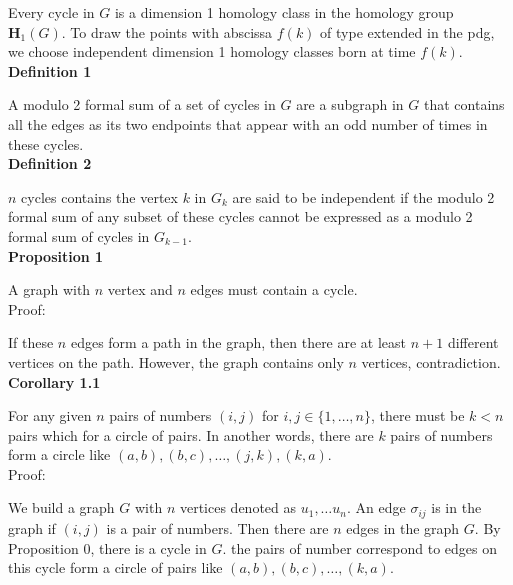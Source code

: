 \documentclass[a4paper,12pt]{article}
\numberwithin{equation}{section}
\begin{document}
	Every cycle in $G$ is a dimension 1 homology class in the homology group $\mathbf{H}_1(G)$. To draw the points with abscissa $f(k)$ of type extended in the pdg, we choose independent dimension 1 homology classes born at time $f(k)$.\\
	
	
	\noindent \textbf{Definition 1}
	
	A modulo 2 formal sum of a set of cycles in $G$ are a subgraph in $G$ that contains all the edges as its two endpoints that appear with an odd number of times in these cycles.	\\
	
	\noindent \textbf{Definition 2}
	
	$n$ cycles contains the vertex $k$ in $G_k$ are said to be independent if the modulo 2 formal sum of any subset of these cycles cannot be expressed as a modulo 2 formal sum of cycles in $G_{k-1}$.\\
	
	\noindent \textbf{Proposition 1}
	
	A graph with $n$ vertex and $n$ edges must contain a cycle.\\
	
	\noindent Proof: 
	
	If these $n$ edges form a path in the graph, then there are at least $n+1$ different vertices on the path. However, the graph contains only $n$ vertices, contradiction.\\
	
	\noindent \textbf{Corollary 1.1}
	
	For any given $n$ pairs of numbers $(i,j)$ for $i,j \in \{1,\ldots, n\}$, there must be $k<n$ pairs which for a circle of pairs. In another words, there are $k$ pairs of numbers form a circle like $(a,b),(b,c),\ldots,(j,k),(k,a)$.\\
	
	\noindent Proof: 
	
	We build a graph $G$ with $n$ vertices denoted as $u_1,\ldots u_n$. An edge $\sigma_{ij}$ is in the graph if $(i,j)$ is a pair of numbers. Then there are $n$ edges in the graph $G$. By Proposition 0, there is a cycle in $G$. the pairs of number correspond to edges on this cycle form a circle of pairs like $(a,b),(b,c),\ldots,(k,a)$.\\
	
\end{document}
